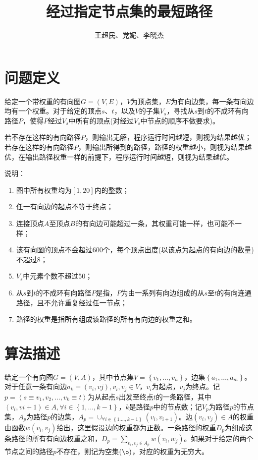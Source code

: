 \documentclass[UTF8]{ctexart}
\author{王超民、党妮、李晓杰}
\title{经过指定节点集的最短路径}
\begin{document}
\maketitle
\section{问题定义}

给定一个带权重的有向图$G=(V,E)$，$V$为顶点集，$E$为有向边集，每一条有向边均有一个权重。对于给定的顶点$s$、$t$，以及$V$的子集$V_{s}$，寻找从$s$到$t$的不成环有向路径$P$，使得$P$经过$V_{s}$中所有的顶点(对经过$V_{s}$中节点的顺序不做要求)。\par
若不存在这样的有向路径$P$，则输出无解，程序运行时间越短，则视为结果越优；若存在这样的有向路径$P$，则输出所得到的路径，路径的权重越小，则视为结果越优，在输出路径权重一样的前提下，程序运行时间越短，则视为结果越优。\par
说明：\par
\begin{enumerate}[\indent 1)]
    \item 图中所有权重均为$\left [ 1,20 \right ]$内的整数；
    \item 任一有向边的起点不等于终点；
    \item 连接顶点$A$至顶点$B$的有向边可能超过一条，其权重可能一样，也可能不一样；
    \item 该有向图的顶点不会超过600个，每个顶点出度(以该点为起点的有向边的数量)不超过8；
    \item $V_{s}$中元素个数不超过50；
    \item 从$s$到$t$的不成环有向路径$P$是指，$P$为由一系列有向边组成的从$s$至$t$的有向连通路径，且不允许重复经过任一节点；
    \item 路径的权重是指所有组成该路径的所有有向边的权重之和。
\end{enumerate}
\section{算法描述}
\par 给定一个有向图$G=(V,A)$，其中节点集$V=\left \{  v_{1},\dots ,v_{n}\right \}$，边集$\left \{  a_{1},\dots ,a_{m}\right \}$。对于任意一条有向边$a_{k}=\left ( v_{i},v{j} \right ),v_{i},v_{j}\in V$，$v_{i}$为起点，$v_{j}$为终点。记$p=\left \langle s\equiv v_{1},v_{2},\dots,v_{k}\equiv t \right \rangle$为从起点$s$出发至终点$t$的一条路径，其中$\left ( v_{i},v{i+1} \right )\in A,\forall i\in\left \{ 1,\dots,k-1 \right \}$，$k$是路径$p$中的节点数；记$V_{p}$为路径$p$的节点集，$A_{p}$为路径$p$的边集，$A_{p}=\cup _{\forall i \in \left \{ 1.\dots,k-1 \right \}}\left ( v_{i},v_{i+1} \right )$。边$\left (v_{i},v_{j}  \right ) \in A$的权重由函数$w\left (v_{i},v_{j}  \right )$给出，这里假设边的权重都为正数。一条路径的权重$D_{p}$为组成这条路径的所有有向边权重之和，$D_{p}=\sum _{v_{i},v_{j}\in A_{p}}w(v_{i},w_{j})$。如果对于给定的两个节点之间的路径$p$不存在，则记为空集$\left ( \o \right )$，对应的权重为无穷大。
\end{document}
